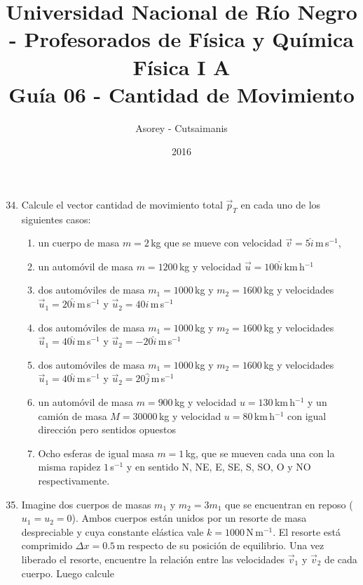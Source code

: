 \documentclass[a4paper,12pt]{article}
\begin{document}
\title{
{\normalsize{Universidad Nacional de Río Negro - Profesorados de Física y
Química}}\\ Física I A \\ Guía 06 - Cantidad de Movimiento}
\author{Asorey - Cutsaimanis}
\date{2016}
\maketitle

\begin{enumerate}
	\setcounter{enumi}{33}      %
	\item Calcule el vector cantidad de movimiento total $\vec p_T$ en cada uno
		de los siguientes casos:
		\begin{enumerate}
			\item un cuerpo de masa $m=2$\,kg que se mueve con velocidad $\vec
				v=5 \hat i$\,m\,s$^{-1}$,
			\item un automóvil de masa $m=1200$\,kg y velocidad $\vec u=100
				\hat i$\,km\,h$^{-1}$
			\item dos automóviles de masa $m_1=1000$\,kg y $m_2=1600$\,kg y
				velocidades $\vec u_1=20 \hat i$\,m\,s$^{-1}$ y $\vec u_2=40
				\hat i $\,m\,s$^{-1}$
			\item dos automóviles de masa $m_1=1000$\,kg y $m_2=1600$\,kg y
				velocidades $\vec u_1=40 \hat i$\,m\,s$^{-1}$ y $\vec u_2=-20
				\hat i$\,m\,s$^{-1}$
			\item dos automóviles de masa $m_1=1000$\,kg y $m_2=1600$\,kg y
				velocidades $\vec u_1=40 \hat i$\,m\,s$^{-1}$ y $\vec u_2=20
				\hat j$\,m\,s$^{-1}$
			\item un automóvil de masa $m=900$\,kg y velocidad
				$u=130$\,km\,h$^{-1}$ y un camión de masa $M=30000$\,kg y
				velocidad $u=80$\,km\,h$^{-1}$ con igual dirección pero
				sentidos opuestos
			\item Ocho esferas de igual masa $m=1$\,kg, que se mueven cada una
				con la misma rapidez $1$\,s$^{-1}$ y en sentido N, NE, E, SE,
				S, SO, O y NO respectivamente.
		\end{enumerate}
	\item Imagine dos cuerpos de masas $m_1$ y $m_2=3 m_1$ que se encuentran en
		reposo ($u_1=u_2=0$). Ambos cuerpos están unidos por un resorte de masa
		despreciable y cuya constante elástica vale $k=1000$\,N\,m$^{-1}$. El
		resorte está comprimido $\Delta x=0.5$\,m respecto de su posición de
		equilibrio. Una vez liberado el resorte, encuentre la relación entre
		las velocidades $\vec v_1$ y $\vec v_2$ de cada cuerpo. Luego calcule

\end{enumerate}
\end{document}
